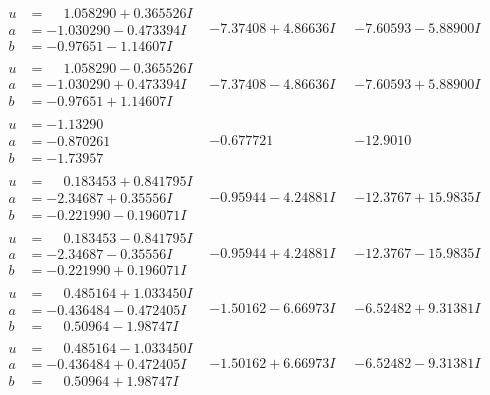 \documentclass[1p]{elsarticle_modified}
\theoremstyle{definition}
\begin{document}
$$\begin{array}{c|c|c}
\begin{aligned}
u &= \phantom{-}1.058290 + 0.365526 I \\
a &= -1.030290 - 0.473394 I \\
b &= -0.97651 - 1.14607 I\end{aligned}
 & -7.37408 + 4.86636 I & -7.60593 - 5.88900 I \\ \hline\begin{aligned}
u &= \phantom{-}1.058290 - 0.365526 I \\
a &= -1.030290 + 0.473394 I \\
b &= -0.97651 + 1.14607 I\end{aligned}
 & -7.37408 - 4.86636 I & -7.60593 + 5.88900 I \\ \hline\begin{aligned}
u &= -1.13290\phantom{ +0.000000I} \\
a &= -0.870261\phantom{ +0.000000I} \\
b &= -1.73957\phantom{ +0.000000I}\end{aligned}
 & -0.677721\phantom{ +0.000000I} & -12.9010\phantom{ +0.000000I} \\ \hline\begin{aligned}
u &= \phantom{-}0.183453 + 0.841795 I \\
a &= -2.34687 + 0.35556 I \\
b &= -0.221990 - 0.196071 I\end{aligned}
 & -0.95944 - 4.24881 I & -12.3767 + 15.9835 I \\ \hline\begin{aligned}
u &= \phantom{-}0.183453 - 0.841795 I \\
a &= -2.34687 - 0.35556 I \\
b &= -0.221990 + 0.196071 I\end{aligned}
 & -0.95944 + 4.24881 I & -12.3767 - 15.9835 I \\ \hline\begin{aligned}
u &= \phantom{-}0.485164 + 1.033450 I \\
a &= -0.436484 - 0.472405 I \\
b &= \phantom{-}0.50964 - 1.98747 I\end{aligned}
 & -1.50162 - 6.66973 I & -6.52482 + 9.31381 I \\ \hline\begin{aligned}
u &= \phantom{-}0.485164 - 1.033450 I \\
a &= -0.436484 + 0.472405 I \\
b &= \phantom{-}0.50964 + 1.98747 I\end{aligned}
 & -1.50162 + 6.66973 I & -6.52482 - 9.31381 I \\ \hline\begin{aligned}

\end{aligned}
\end{array}$$
\end{document}
